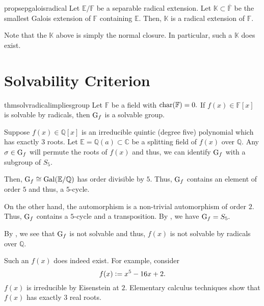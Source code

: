 \begin{restatable}[]{prop}{sepgaloisradical}
\label{prop:sepgaloisradical}
	Let $\mathbb{E}/\mathbb{F}$ be a separable radical extension. Let $\mathbb{K} \subset \overline{\mathbb{F}}$ be the smallest Galois extension of $\mathbb{F}$ containing $\mathbb{E}.$ Then, $\mathbb{K}$ is a radical extension of $\mathbb{F}.$ \hfill\hyperref[prop:sepgaloisradical2]{\downsym}
\end{restatable}

Note that the $\mathbb{K}$ above is simply the normal closure. In particular, such a $\mathbb{K}$ does exist.

\section{Solvability Criterion}

\begin{restatable}[]{thm}{solvradicalimpliesgroup}
\label{thm:solvradicalimpliesgroup}
	Let $\mathbb{F}$ be a field with $\operatorname{char}(\mathbb{F}) = 0.$ If $f(x) \in \mathbb{F}[x]$ is solvable by radicals, then $\operatorname{G}_f$ is a solvable group.  \hfill\hyperref[thm:solvradicalimpliesgroup2]{\downsym}
\end{restatable}

\begin{ex}
	Suppose $f(x) \in \mathbb{Q}[x]$ is an irreducible quintic (degree five) polynomial which has exactly $3$ roots. Let $\mathbb{E} = \mathbb{Q}(a) \subset \mathbb{C}$ be a splitting field of $f(x)$ over $\mathbb{Q}.$ Any $\sigma \in \operatorname{G}_f$ will permute the roots of $f(x)$ and thus, we can identify $\operatorname{G}_f$ with a subgroup of $S_5.$

	Then, $\operatorname{G}_f \cong \operatorname{Gal}(\mathbb{E}/\mathbb{Q})$ has order divisible by $5.$ Thus, $\operatorname{G}_f$ contains an element of order $5$ and thus, a $5$-cycle.

	On the other hand, the automorphism is a non-trivial automorphism of order $2.$ Thus, $\operatorname{G}_f$ contains a $5$-cycle and a transposition. By , we have $\operatorname{G}_f = S_5.$

	By , we see that $\operatorname{G}_f$ is not solvable and thus, $f(x)$ is not solvable by radicals over $\mathbb{Q}.$

	Such an $f(x)$ does indeed exist. For example, consider
	\begin{equation*} 
		f(x) \vcentcolon= x^5 - 16x + 2.
	\end{equation*}
	$f(x)$ is irreducible by Eisenstein at $2.$ Elementary calculus techniques show that $f(x)$ has exactly $3$ real roots.
\end{ex}

